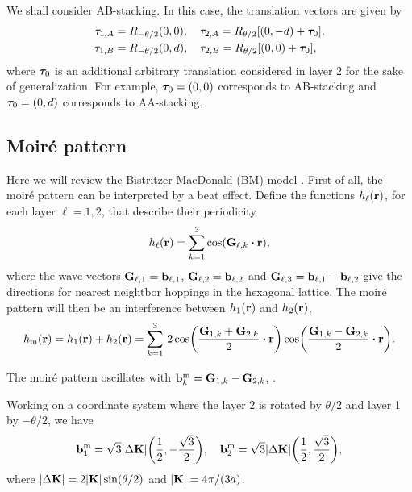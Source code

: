 \documentclass[a4paper,12pt]{report}
\begin{document}
We shall consider AB-stacking. In this case, the translation vectors are given by
\begin{align}
\tau_{1,A} &= R_{-\theta/2}(0,0), \quad \tau_{2,A} = R_{\theta/2} [(0,-d) + {\bm{\tau}}_0], \label{eq:tauA} \\
\tau_{1,B} &= R_{-\theta/2}(0,d), \quad \tau_{2,B} = R_{\theta/2} [(0,0) + {\bm{\tau}}_0], \label{eq:tauB}
\end{align}
where ${\bm{\tau}}_0$ is an additional arbitrary translation considered in layer 2 for the sake of generalization. For example, ${\bm{\tau}}_0 = (0,0)$ corresponds to AB-stacking and ${\bm{\tau}}_0 = (0, d)$ corresponds to AA-stacking.

\subsection{Moiré pattern}

Here we will review the Bistritzer-MacDonald (BM) model \cite{macdonald2011}. First of all, the moiré pattern can be interpreted by a beat effect. Define the functions $h_\ell({\vb{r}})$, for each layer $\ell = 1, 2$, that describe their periodicity
\begin{equation} \label{eq:beat-functions}
h_\ell(\r) = \sum_{k=1}^{3} \cos(\vb{G}_{\ell,k} \vdot \r),
\end{equation}
where the wave vectors $\vb{G}_{\ell,1} = \vb{b}_{\ell,1}$, $\vb{G}_{\ell,2} = \vb{b}_{\ell,2}$ and $\vb{G}_{\ell,3} = \vb{b}_{\ell,1} - \vb{b}_{\ell,2}$ give the directions for nearest neightbor hoppings in the hexagonal lattice. The moiré pattern will then be an interference between $h_1({\vb{r}})$ and $h_2({\vb{r}})$,
\begin{equation} \label{eq:beat-effect}
h_{\text{m}}(\r) = h_1(\r) + h_2(\r) =
\sum_{k=1}^{3}
\, 2 \cos(\frac{\vb{G}_{1,k}+\vb{G}_{2,k}}{2} \vdot \r) \cos(\frac{\vb{G}_{1,k}-\vb{G}_{2,k}}{2} \vdot \r).
\end{equation}

The moiré pattern oscillates with $\vb{b}_k^{\text{m}} = \vb{G}_{1,k} - \vb{G}_{2,k}$, \cite{handbook2019}.

\n

Working on a coordinate system where the layer 2 is rotated by $\theta/2$ and layer 1 by $-\theta/2$, we have
\begin{equation} \label{eq:moire-bvecs}
\vb{b}_1^{\text{m}} = \sqrt{3} \abs{\Delta {\vb{K}}} \qty( \frac{1}{2}, -\frac{\sqrt{3}}{2}), \quad
\vb{b}_2^{\text{m}} = \sqrt{3} \abs{\Delta {\vb{K}}} \qty( \frac{1}{2},  \frac{\sqrt{3}}{2}),
\end{equation}
where $\abs{\Delta {\vb{K}}} = 2 \abs{{\vb{K}}} \sin(\theta/2)$ and $\abs{{\vb{K}}} = 4\pi/(3a)$.
\end{document}
